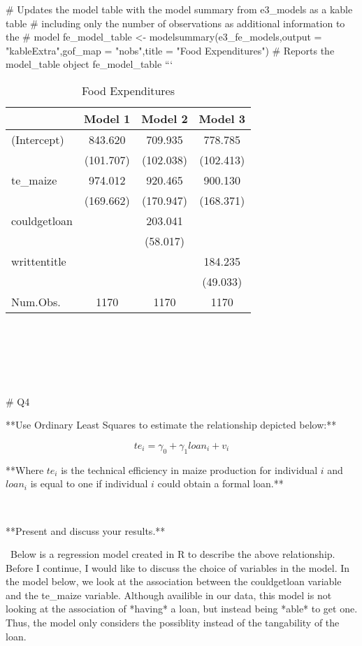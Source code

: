 \documentclass[
]{article}
\begin{document}
\begin{}
# Updates the model table with the model summary from e3_models as a kable table
# including only the number of observations as additional information to the 
# model
fe_model_table <- modelsummary(e3_fe_models,output = "kableExtra",gof_map = "nobs",title = "Food Expenditures") %
# Reports the model_table object
fe_model_table
```

\begin{table}

\caption{\label{tab:unnamed-chunk-6}Food Expenditures}
\centering
\begin{tabular}[t]{lccc}
\toprule
  & Model 1 & Model 2 & Model 3\\
\midrule
(Intercept) & \num{843.620} & \num{709.935} & \num{778.785}\\
 & (\num{101.707}) & (\num{102.038}) & (\num{102.413})\\
te\_maize & \num{974.012} & \num{920.465} & \num{900.130}\\
 & (\num{169.662}) & (\num{170.947}) & (\num{168.371})\\
couldgetloan &  & \num{203.041} & \\
 &  & (\num{58.017}) & \\
writtentitle &  &  & \num{184.235}\\
 &  &  & (\num{49.033})\\
\midrule
Num.Obs. & \num{1170} & \num{1170} & \num{1170}\\
\bottomrule
\end{tabular}
\end{table}
\

\

\


# Q4

**Use Ordinary Least Squares to estimate the relationship depicted below:**

$$te_i = \gamma_0 + \gamma_1 loan_i + v_i$$

**Where $te_i$ is the technical efficiency in maize production for individual $i$ and $loan_i$ is equal to one if individual $i$ could obtain a formal loan.**

\

**Present and discuss your results.**

\
Below is a regression model created in R to describe the above relationship. Before I continue, I would like to discuss the choice of variables in the model. In the model below, we look at the association between the couldgetloan variable and the te_maize variable. Although availible in our data, this model is not looking at the association of *having* a loan, but instead being *able* to get one. Thus, the model only considers the possiblity instead of the tangability of the loan.


\end{}
\end{document}
